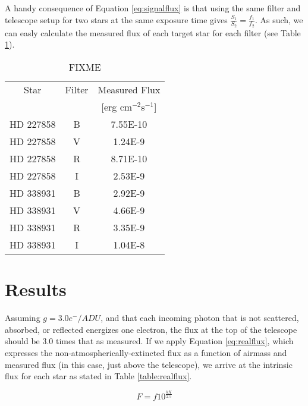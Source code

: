 \documentclass{article}
\begin{document}
A handy consequence of Equation \ref{eq:signalflux} is that using the same filter and telescope setup for two
stars at the same exposure time gives $\frac{S_1}{S_2}=\frac{f_1}{f_2}$. As such, we can easly calculate the measured flux
of each target star for each filter (see Table \ref{table:fluxes}).

\begin{table}
\begin{center}
\begin{tabular}{c | c | c}
Star& Filter & Measured Flux\\
& &[erg cm$^{-2}$s$^{-1}$]\\
\hline
HD 227858 & B & 7.55E-10\\
HD 227858 & V & 1.24E-9\\
HD 227858 & R & 8.71E-10\\
HD 227858 & I & 2.53E-9\\
HD 338931 &B & 2.92E-9\\
HD 338931 &V & 4.66E-9\\
HD 338931 &R & 3.35E-9\\
HD 338931 & I & 1.04E-8\\
\end{tabular}
\caption{FIXME}
\label{table:fluxes}
\end{center}
\end{table}


\section{Results}
Assuming $g=3.0e^-/ADU$, and that each incoming photon that is not scattered, absorbed, or reflected energizes one electron,
the flux at the top of the telescope should be 3.0 times that as measured. If we apply Equation \ref{eq:realflux}, which expresses the
non-atmospherically-extincted flux as a function of airmass and measured flux (in this case, just above the telescope), we arrive at the
intrinsic flux for each star as stated in Table \ref{table:realflux}.

\begin{equation}
\label{eq:realflux}
F=f10^{\frac{kX}{2.5}}
\end{equation}
\end{document}

